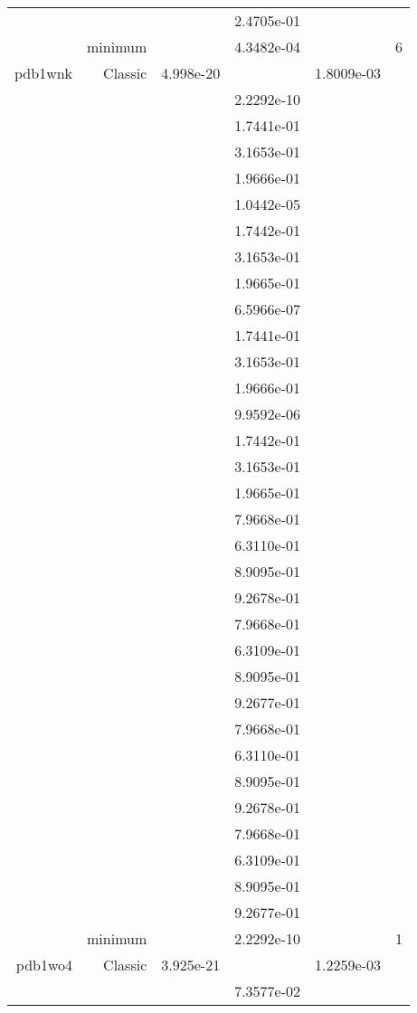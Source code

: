 \begin{xltabular}{\textwidth}{r|rS[table-format=1.3e+2]S[table-format=1.4e+2]S[table-format=1.4e+2]S[table-format=-1.5]}
&  &  & 2.4705e-01 & & \\
& minimum &  & 4.3482e-04 & & 6 \\  \addlinespace
pdb1wnk & Classic & 4.998e-20 &  & 1.8009e-03 & \\
&  &  & 2.2292e-10 & & \\
&  &  & 1.7441e-01 & & \\
&  &  & 3.1653e-01 & & \\
&  &  & 1.9666e-01 & & \\
&  &  & 1.0442e-05 & & \\
&  &  & 1.7442e-01 & & \\
&  &  & 3.1653e-01 & & \\
&  &  & 1.9665e-01 & & \\
&  &  & 6.5966e-07 & & \\
&  &  & 1.7441e-01 & & \\
&  &  & 3.1653e-01 & & \\
&  &  & 1.9666e-01 & & \\
&  &  & 9.9592e-06 & & \\
&  &  & 1.7442e-01 & & \\
&  &  & 3.1653e-01 & & \\
&  &  & 1.9665e-01 & & \\
&  &  & 7.9668e-01 & & \\
&  &  & 6.3110e-01 & & \\
&  &  & 8.9095e-01 & & \\
&  &  & 9.2678e-01 & & \\
&  &  & 7.9668e-01 & & \\
&  &  & 6.3109e-01 & & \\
&  &  & 8.9095e-01 & & \\
&  &  & 9.2677e-01 & & \\
&  &  & 7.9668e-01 & & \\
&  &  & 6.3110e-01 & & \\
&  &  & 8.9095e-01 & & \\
&  &  & 9.2678e-01 & & \\
&  &  & 7.9668e-01 & & \\
&  &  & 6.3109e-01 & & \\
&  &  & 8.9095e-01 & & \\
&  &  & 9.2677e-01 & & \\
& minimum &  & 2.2292e-10 & & 1 \\  \addlinespace
pdb1wo4 & Classic & 3.925e-21 &  & 1.2259e-03 & \\
&  &  & 7.3577e-02 & & \\

\end{xltabular}
